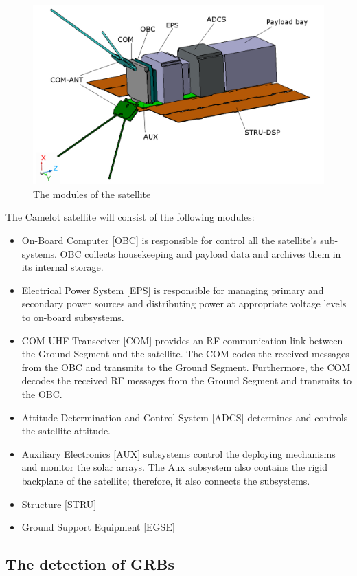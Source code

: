\documentclass[12pt, a4paper,titlepage]{article}
\numberwithin{equation}{section}
\numberwithin{figure}{section}
\begin{document}
\begin{figure}[H]
\centering
\includegraphics[width=130.0mm]{images/satellite_modules.png}
\caption{The modules of the satellite}
\end{figure}

The Camelot satellite will consist of the following modules:

\begin{itemize}
\item On-Board Computer [OBC] is responsible for control all the satellite’s sub-systems. OBC collects housekeeping and payload data and archives them in its internal storage.
\item Electrical Power System [EPS] is responsible for managing primary and secondary power sources and distributing power at appropriate voltage levels to on-board subsystems.
\item COM UHF Transceiver [COM] provides an RF communication link between the Ground Segment and the satellite. The COM codes the received messages from the OBC and transmits to the Ground Segment. Furthermore, the COM decodes the received RF messages from the Ground Segment and transmits to the OBC.
\item Attitude Determination and Control System [ADCS] determines and controls the satellite attitude.
\item Auxiliary Electronics [AUX] subsystems control the deploying mechanisms and monitor the
solar arrays. The Aux subsystem also contains the rigid backplane of the satellite; therefore, it also connects the subsystems.
\item Structure [STRU]
\item Ground Support Equipment [EGSE]
\end{itemize}

\subsection{The detection of GRBs}
\end{document}
